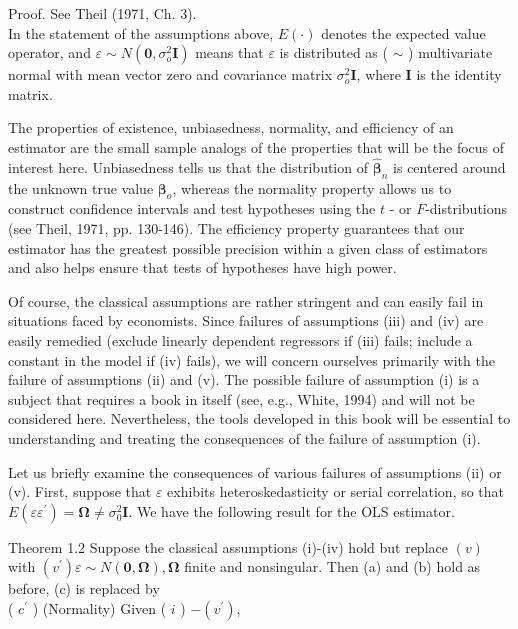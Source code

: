 \documentclass[10pt]{article}
\begin{document}
Proof. See Theil (1971, Ch. 3).\\
In the statement of the assumptions above, $E(\cdot)$ denotes the expected value operator, and $\varepsilon \sim N\left(\mathbf{0}, \sigma_{o}^{2} \mathbf{I}\right)$ means that $\varepsilon$ is distributed as ( $\sim$ ) multivariate normal with mean vector zero and covariance matrix $\sigma_{o}^{2} \mathbf{I}$, where $\mathbf{I}$ is the identity matrix.

The properties of existence, unbiasedness, normality, and efficiency of an estimator are the small sample analogs of the properties that will be the focus of interest here. Unbiasedness tells us that the distribution of $\hat{\boldsymbol{\beta}}_{n}$ is centered around the unknown true value $\boldsymbol{\beta}_{o}$, whereas the normality property allows us to construct confidence intervals and test hypotheses using the $t$ - or $F$-distributions (see Theil, 1971, pp. 130-146). The efficiency property guarantees that our estimator has the greatest possible precision within a given class of estimators and also helps ensure that tests of hypotheses have high power.

Of course, the classical assumptions are rather stringent and can easily fail in situations faced by economists. Since failures of assumptions (iii) and (iv) are easily remedied (exclude linearly dependent regressors if (iii) fails; include a constant in the model if (iv) fails), we will concern ourselves primarily with the failure of assumptions (ii) and (v). The possible failure of assumption (i) is a subject that requires a book in itself (see, e.g., White, 1994) and will not be considered here. Nevertheless, the tools developed in this book will be essential to understanding and treating the consequences of the failure of assumption (i).

Let us briefly examine the consequences of various failures of assumptions (ii) or (v). First, suppose that $\varepsilon$ exhibits heteroskedasticity or serial correlation, so that $E\left(\varepsilon \varepsilon^{\prime}\right)=\boldsymbol{\Omega} \neq \sigma_{0}^{2} \mathbf{I}$. We have the following result for the OLS estimator.

Theorem 1.2 Suppose the classical assumptions (i)-(iv) hold but replace $(v)$ with $\left(v^{\prime}\right) \varepsilon \sim N(\mathbf{0}, \boldsymbol{\Omega}), \boldsymbol{\Omega}$ finite and nonsingular. Then (a) and (b) hold as before, (c) is replaced by\\
( $c^{\prime}$ ) (Normality) Given ( $i$ ) $-\left(v^{\prime}\right)$,
\end{document}

